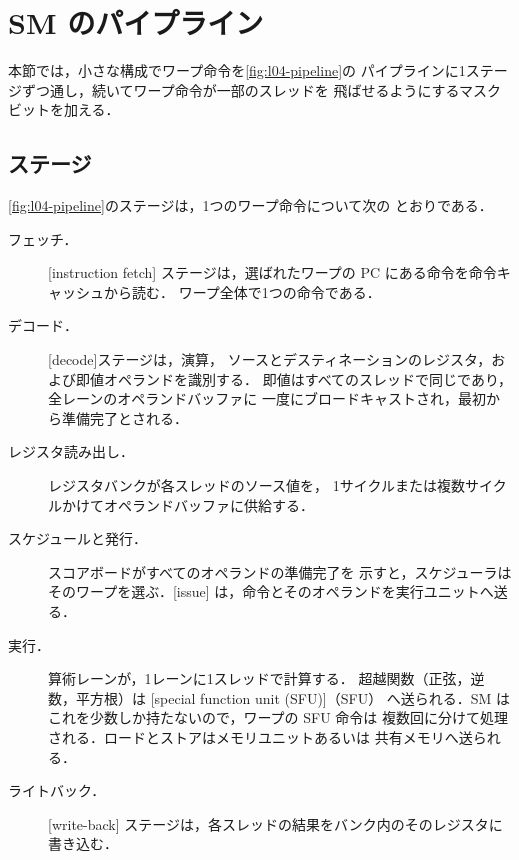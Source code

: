 \documentclass[../main.tex]{subfiles}
\begin{document}
\section{SM のパイプライン}
\label{sec:l04-pipeline}

本節では，小さな構成でワープ命令を\cref{fig:l04-pipeline}の
パイプラインに1ステージずつ通し，続いてワープ命令が一部のスレッドを
飛ばせるようにするマスクビットを加える．

\subsection{ステージ}

\cref{fig:l04-pipeline}のステージは，1つのワープ命令について次の
とおりである．
\begin{description}
  \item[フェッチ．] [instruction fetch]
    ステージは，選ばれたワープの PC にある命令を命令キャッシュから読む．
    ワープ全体で1つの命令である．
  \item[デコード．] [decode]ステージは，演算，
    ソースとデスティネーションのレジスタ，および即値オペランドを識別する．
    即値はすべてのスレッドで同じであり，全レーンのオペランドバッファに
    一度にブロードキャストされ，最初から準備完了とされる．
  \item[レジスタ読み出し．] レジスタバンクが各スレッドのソース値を，
    1サイクルまたは複数サイクルかけてオペランドバッファに供給する．
  \item[スケジュールと発行．] スコアボードがすべてのオペランドの準備完了を
    示すと，スケジューラはそのワープを選ぶ．[issue]
    は，命令とそのオペランドを実行ユニットへ送る．
  \item[実行．] 算術レーンが，1レーンに1スレッドで計算する．
    超越関数（正弦，逆数，平方根）は
    [special function unit (SFU)]（SFU）
    へ送られる．SM はこれを少数しか持たないので，ワープの SFU 命令は
    複数回に分けて処理される．ロードとストアはメモリユニットあるいは
    共有メモリへ送られる．
  \item[ライトバック．] [write-back]
    ステージは，各スレッドの結果をバンク内のそのレジスタに書き込む．
\end{description}
\end{document}
